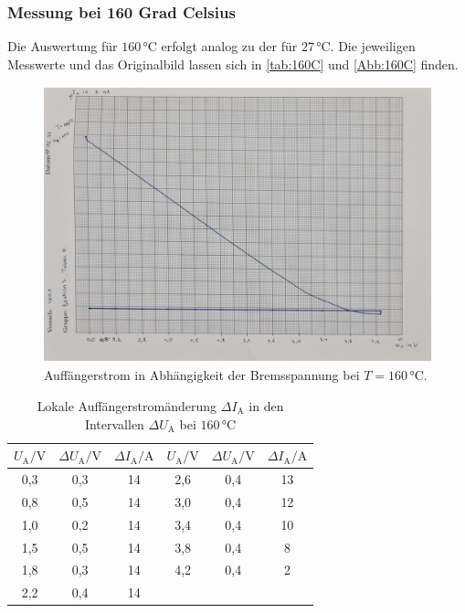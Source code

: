 \subsubsection{Messung bei 160 Grad Celsius}

Die Auswertung für $160 \, \si{\celsius}$ erfolgt analog zu der für $27 \, \si{\celsius}$.
Die jeweiligen Messwerte und das Originalbild lassen sich in \autoref{tab:160C} und 
\autoref{Abb:160C} finden.

\begin{figure}
  \centering
  \includegraphics[height=8cm]{Messwerte/b.jpg}
  \caption{Auffängerstrom in Abhängigkeit der Bremsspannung bei $T=160\,\si{\celsius}$.}
  \label{Abb:160C}
\end{figure}

\begin{table}[!h]
  \begin{center}
    \begin{tabular}{|c|c|c||c|c|c|}
      \hline
      $U_{\mathrm{A}} / \si{\volt}$ & $\Delta U_{\mathrm{A}} / \si{\volt}$ & $\Delta I_{\mathrm{A}} / \si{\ampere}$ & $U_{\mathrm{A}} / \si{\volt}$ & $\Delta U_{\mathrm{A}} / \si{\volt}$ & $\Delta I_{\mathrm{A}} / \si{\ampere}$\\
      \hline
      0,3 & 0,3 & 14 & 2,6 & 0,4 & 13  \\
      0,8 & 0,5 & 14 & 3,0 & 0,4 & 12  \\
      1,0 & 0,2 & 14 & 3,4 & 0,4 & 10  \\
      1,5 & 0,5 & 14 & 3,8 & 0,4 & 8  \\
      1,8 & 0,3 & 14 & 4,2 & 0,4 & 2 \\
      2,2 & 0,4 & 14 & & & \\
      \hline
    \end{tabular}
    \caption{Lokale Auffängerstromänderung $\Delta I_{\mathrm{A}}$ in den Intervallen $\Delta U_{\mathrm{A}}$ bei $160 \, \si{\celsius}$}
    \label{tab:160C}
  \end{center}
\end{table}

